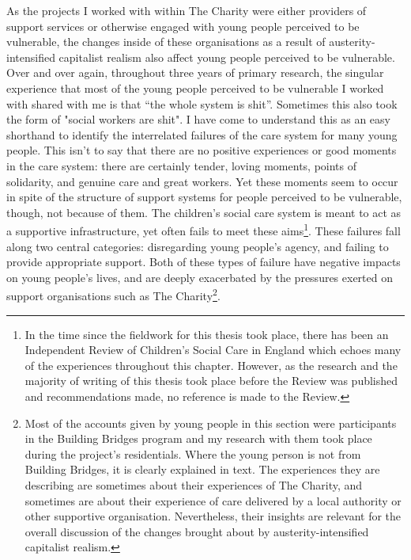 As the projects I worked with within The Charity were either providers of support services or otherwise engaged with young people perceived to be vulnerable, the changes inside of these organisations as a result of austerity-intensified capitalist realism also affect young people perceived to be vulnerable. Over and over again, throughout three years of primary research, the singular experience that most of the young people perceived to be vulnerable I worked with shared with me is that “the whole system is shit”. Sometimes this also took the form of "social workers are shit". I have come to understand this as an easy shorthand to identify the interrelated failures of the care system for many young people. This isn’t to say that there are no positive experiences or good moments in the care system: there are certainly tender, loving moments, points of solidarity, and genuine care and great workers. Yet these moments seem to occur in spite of the structure of support systems for people perceived to be vulnerable, though, not because of them. The children's social care system is meant to act as a supportive infrastructure, yet often fails to meet these aims\footnote{In the time since the fieldwork for this thesis took place, there has been an Independent Review of Children's Social Care in England which echoes many of the experiences throughout this chapter. However, as the research and the majority of writing of this thesis took place before the Review was published and recommendations made, no reference is made to the Review.}. These failures fall along two central categories: disregarding young people's agency, and failing to provide appropriate support. Both of these types of failure have negative impacts on young people's lives, and are deeply exacerbated by the pressures exerted on support organisations such as The Charity\footnote{Most of the accounts given by young people in this section were participants in the Building Bridges program and my research with them took place during the project's residentials. Where the young person is not from Building Bridges, it is clearly explained in text. The experiences they are describing are sometimes about their experiences of The Charity, and sometimes are about their experience of care delivered by a local authority or other supportive organisation. Nevertheless, their insights are relevant for the overall discussion of the changes brought about by austerity-intensified capitalist realism.}.

